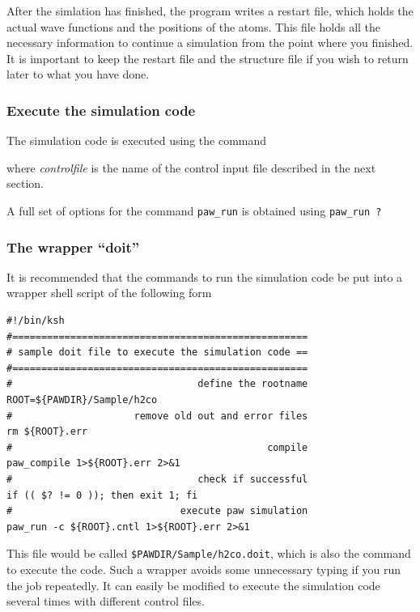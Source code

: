 \documentclass[final,12pt]{article}
\begin{document}
After the simlation has finished, the program writes a restart file, which
holds the actual wave functions and the positions of the atoms. This
file holds all the necessary information to continue a simulation from
the point where you finished.  It is important to keep the restart file
and the structure file if you wish to return later to what you have
done. 

\subsubsection{Execute the simulation code}

The simulation code is executed using the command

\bigskip{}\bigskip

\noindent where {\it controlfile} is the name of the control input file
described in the next section. 

A full set of options for the command {\tt paw\_run} is obtained
using {\tt paw\_run ?}

\subsubsection{The wrapper ``doit''}

It is recommended that the commands to run the simulation code be put into
a wrapper shell script of the following form
\begin{verbatim}
#!/bin/ksh
#===================================================
# sample doit file to execute the simulation code ==
#===================================================
#                                define the rootname 
ROOT=${PAWDIR}/Sample/h2co                               
#                     remove old out and error files
rm ${ROOT}.err 
#                                            compile
paw_compile 1>${ROOT}.err 2>&1
#                                check if successful
if (( $? != 0 )); then exit 1; fi                        
#                             execute paw simulation
paw_run -c ${ROOT}.cntl 1>${ROOT}.err 2>&1
\end{verbatim}
This file would be called {\tt \$PAWDIR/Sample/h2co.doit}, which is
also the command to execute the code.  Such a wrapper avoids some
unnecessary typing if you run the job repeatedly. It can easily be
modified to execute the simulation code several times with different
control files.
\end{document}
